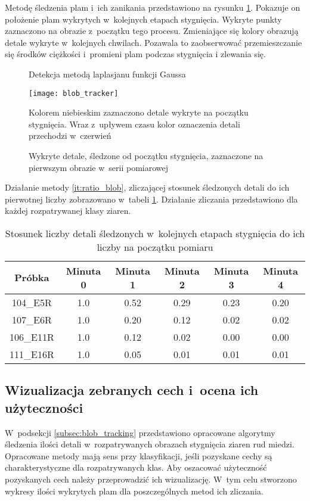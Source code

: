 Metodę śledzenia plam i~ich zanikania przedstawiono na rysunku
\ref{fig:blob_remain}.
Pokazuje on położenie plam wykrytych w~kolejnych etapach stygnięcia.
Wykryte punkty zaznaczono na obrazie z~początku tego procesu.
Zmieniające się kolory obrazują detale wykryte w~kolejnych chwilach.
Pozawala to zaobserwować przemieszczanie się środków ciężkości i~promieni
plam podczas stygnięcia i zlewania się.
\begin{figure}[htb]
	\centering
	\caption*{\scriptsize Detekcja metodą laplasjanu funkcji Gaussa}
	\texttt{[image: blob\_tracker]}
	\vspace{0.3cm}
	\caption*{\scriptsize
		Kolorem niebieskim zaznaczono detale wykryte na początku stygnięcia.
		Wraz z~upływem czasu kolor oznaczenia detali przechodzi w~czerwień}
	\caption{Wykryte detale, śledzone od początku stygnięcia, zaznaczone na
		pierwszym obrazie w~serii pomiarowej}
	\label{fig:blob_remain}
\end{figure}
Działanie metody \ref{it:ratio_blob}, zliczającej stosunek śledzonych detali
do ich pierwotnej liczby zobrazowano w~tabeli \ref{tab:blob_ratio}.
Działanie zliczania przedstawiono dla każdej rozpatrywanej klasy ziaren.
\begin{table}[htb]
	\centering
	\begin{tabular}{c|c|c|c|c|c}
		\toprule
		Próbka    & Minuta 0 & Minuta 1 & Minuta 2 & Minuta 3 & Minuta 4 \\ \midrule
		104\_E5R  & 1.0      & 0.52     & 0.29     & 0.23     & 0.20     \\
		107\_E6R  & 1.0      & 0.20     & 0.12     & 0.02     & 0.02     \\
		106\_E11R & 1.0      & 0.12     & 0.02     & 0.00     & 0.00     \\
		111\_E16R & 1.0      & 0.05     & 0.01     & 0.01     & 0.01     \\
		\bottomrule
	\end{tabular}
	\caption{Stosunek liczby detali śledzonych w~kolejnych etapach stygnięcia do
		ich liczby na początku pomiaru}
	\label{tab:blob_ratio}
\end{table}

\subsection{Wizualizacja zebranych cech i~ocena ich użyteczności}
\label{subsec:data_vis}
W~podsekcji \ref{subsec:blob_tracking} przedstawiono opracowane algorytmy
śledzenia ilości detali w~rozpatrywanych obrazach stygnięcia ziaren rud
miedzi.
Opracowane metody mają sens przy klasyfikacji, jeśli pozyskane cechy są
charakterystyczne dla rozpatrywanych klas.
Aby oszacować użyteczność pozyskanych cech należy przeprowadzić ich
wizualizację.
W~tym celu stworzono wykresy ilości wykrytych plam dla poszczególnych
metod ich zliczania.

